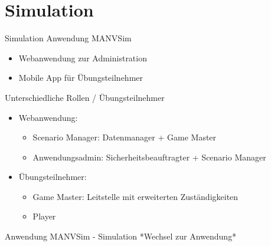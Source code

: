 
\section{Simulation}

\begin{frame}{Simulation}
	Anwendung MANVSim
	\begin{itemize}
		\item Webanwendung zur Administration
		\item Mobile App für Übungsteilnehmer
	\end{itemize}
	Unterschiedliche Rollen / Übungsteilnehmer
	\begin{itemize}
		\item Webanwendung:
		\begin{itemize}
			\item Scenario Manager: Datenmanager + Game Master
			\item Anwendungsadmin: Sicherheitsbeauftragter + Scenario Manager
		\end{itemize}
		\item Übungsteilnehmer:
		\begin{itemize}
			\item Game Master: Leitstelle mit erweiterten Zuständigkeiten
			\item Player
		\end{itemize}
	\end{itemize}
\end{frame}

\begin{frame}{Anwendung MANVSim - Simulation}
	*Wechsel zur Anwendung*
\end{frame}
